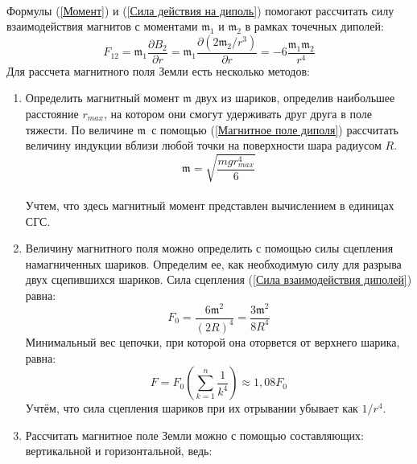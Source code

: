 \documentclass[a4paper, 12pt]{article}
\begin{document}
\paragraph{}
Формулы (\ref{Момент}) и (\ref{Сила действия на диполь}) помогают рассчитать силу взаимодействия магнитов с моментами $\mathfrak{m_{1}}$ и $\mathfrak{m_{2}}$ в рамках точечных диполей:
\begin{equation}
    F_{12} = \mathfrak{m}_{1}{\frac{\partial {B_{2}}}{\partial r}} = \mathfrak{m}_{1}\frac{\partial (2\mathfrak{m}_{2}/r^{3})}{\partial r}  =-6\frac{\mathfrak{m}_{1}\mathfrak{m}_{2}}{r^{4}}
    \label{Сила взаимодействия диполей}
\end{equation}
Для рассчета магнитного поля Земли есть несколько методов:
\begin{enumerate}
    \item Определить магнитный момент $\mathfrak{m}$ двух из шариков, определив наибольшее расстояние $\mathit{r_{max}}$, на котором они смогут удерживать друг друга в поле тяжести. По величине $\mathfrak{m}$\
    с помощью (\ref{Магнитное поле диполя}) рассчитать величину индукции вблизи любой точки на поверхности шара радиусом $\mathit{R}$.
    \begin{equation}
        \mathfrak{m} = \sqrt{\frac{mgr_{max}^{4}}{6}}
        \label{Магнитный момент}
    \end{equation}\\
    Учтем, что здесь магнитный момент представлен вычислением в единицах СГС.
    \item Величину магнитного поля можно определить с помощью силы сцепления намагниченных шариков. Определим ее, как необходимую силу для разрыва двух сцепившихся шариков. Сила сцепления (\ref{Сила взаимодействия диполей}) равна:
    \begin{equation}
        F_{0} = \frac{6\mathfrak{m}^{2}}{(2R)^{4}} = \frac{3\mathfrak{m}^2}{8R^{4}}
        \label{Сила сцепления}
    \end{equation}
    Минимальный вес цепочки, при которой она оторвется от верхнего шарика, равна:
    \begin{equation}
        F = F_{0}\left(\sum_{k = 1}^n \frac{1}{k^{4}}\right) \approx 1,08F_{0}
        \label{Вес цепочки}
    \end{equation}
    Учтём, что сила сцепления шариков при их отрывании убывает как $1/r^{4}$.
    \item Рассчитать магнитное поле Земли можно с помощью составляющих: вертикальной и горизонтальной, ведь:
    \begin{equation}

\end{equation}
\end{enumerate}
\end{document}
